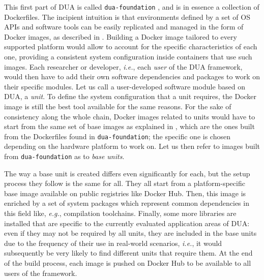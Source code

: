 This first part of DUA is called \texttt{dua-foundation} \cite{masocco_dua-foundation_nodate}, and is in essence a collection of Dockerfiles. The incipient intuition is that environments defined by a set of OS APIs and software tools can be easily replicated and managed in the form of Docker images, as described in . Building a Docker image tailored to every supported platform would allow to account for the specific characteristics of each one, providing a consistent system configuration inside containers that use such images. Each researcher or developer, \emph{i.e.}, each \emph{user} of the DUA framework, would then have to add their own software dependencies and packages to work on their specific modules. Let us call a user-developed software module based on DUA, a \emph{unit}. To define the system configuration that a unit requires, the Docker image is still the best tool available for the same reasons. For the sake of consistency along the whole chain, Docker images related to units would have to start from the same set of base images as explained in , which are the ones built from the Dockerfiles found in \texttt{dua-foundation}; the specific one is chosen depending on the hardware platform to work on. Let us then refer to images built from \texttt{dua-foundation} as to \emph{base units}.

The way a base unit is created differs even significantly for each, but the setup process they follow is the same for all. They all start from a platform-specific base image available on public registries like Docker Hub. Then, this image is enriched by a set of system packages which represent common dependencies in this field like, \emph{e.g.}, compilation toolchains. Finally, some more libraries are installed that are specific to the currently evaluated application areas of DUA: even if they may not be required by all units, they are included in the base units due to the frequency of their use in real-world scenarios, \emph{i.e.}, it would subsequently be very likely to find different units that require them. At the end of the build process, each image is pushed on Docker Hub \cite{masocco_dotxautomationdua-foundation_nodate} to be available to all users of the framework.

